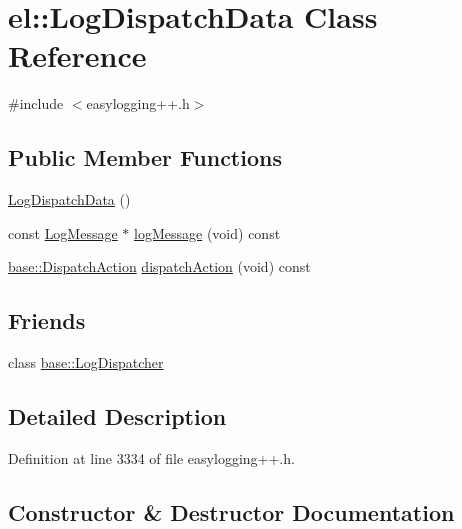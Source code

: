 \hypertarget{classel_1_1_log_dispatch_data}{}\section{el\+:\+:Log\+Dispatch\+Data Class Reference}
\label{classel_1_1_log_dispatch_data}


{\ttfamily \#include $<$easylogging++.\+h$>$}

\subsection*{Public Member Functions}
\begin{DoxyCompactItemize}
\item 
\hyperlink{classel_1_1_log_dispatch_data_a851cab4e58658e3dc8267427fd1e3572}{Log\+Dispatch\+Data} ()
\item 
const \hyperlink{classel_1_1_log_message}{Log\+Message} $\ast$ \hyperlink{classel_1_1_log_dispatch_data_ad52d4ddc330b6260bf10e9879a653829}{log\+Message} (void) const 
\item 
\hyperlink{namespaceel_1_1base_a3aa2563d38e47388ba242a1694fc2839}{base\+::\+Dispatch\+Action} \hyperlink{classel_1_1_log_dispatch_data_aee0808c660aa39b34ee69850a2c74c09}{dispatch\+Action} (void) const 
\end{DoxyCompactItemize}
\subsection*{Friends}
\begin{DoxyCompactItemize}
\item 
class \hyperlink{classel_1_1_log_dispatch_data_a84d22f9ad5b796e49ff5f15a8c32773d}{base\+::\+Log\+Dispatcher}
\end{DoxyCompactItemize}


\subsection{Detailed Description}


Definition at line 3334 of file easylogging++.\+h.



\subsection{Constructor \& Destructor Documentation}
\hypertarget{classel_1_1_log_dispatch_data_a851cab4e58658e3dc8267427fd1e3572}{}
